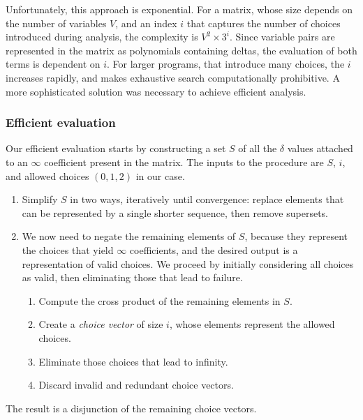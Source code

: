 {{    Unfortunately, this approach is exponential.
    For a matrix, whose size depends on the number of variables $V$, and an index $i$ that captures the number of choices introduced during analysis, the complexity is $V^2 \times 3^i$.
    Since variable pairs are represented in the matrix as polynomials containing deltas, the evaluation of both terms is dependent on $i$.
    For larger programs, that introduce many choices, the $i$ increases rapidly, and makes exhaustive search computationally prohibitive.
    A more sophisticated solution was necessary to achieve efficient analysis.


    \subsubsection{Efficient evaluation}
     Our efficient evaluation starts by constructing a set $S$ of all the $\delta$ values attached to an  $\infty$ coefficient present in the matrix.
    The inputs to the procedure are $S$, $i$, and allowed choices \eg $(0,1,2)$ in our case.
    
    \begin{enumerate}[label=\emph{Step \arabic*.}]
\item Simplify $S$ in two ways, iteratively until convergence: replace elements that can be represented by
    a single shorter sequence, then remove supersets.
\item  We now need to negate the remaining elements of $S$, because they represent the choices that yield \(\infty\) coefficients, and the desired output is a representation of valid choices.
	We proceed by initially considering all choices as valid, then eliminating those that lead to failure.
    \begin{enumerate}
        \item Compute the cross product of the remaining elements in $S$.
        \item Create a \emph{choice vector} of size $i$, whose elements represent the allowed choices.
        \item Eliminate those choices that lead to infinity.
        \item Discard invalid and redundant choice vectors.
    \end{enumerate}
    \end{enumerate}
    The result is a disjunction of the remaining choice vectors.

}}

